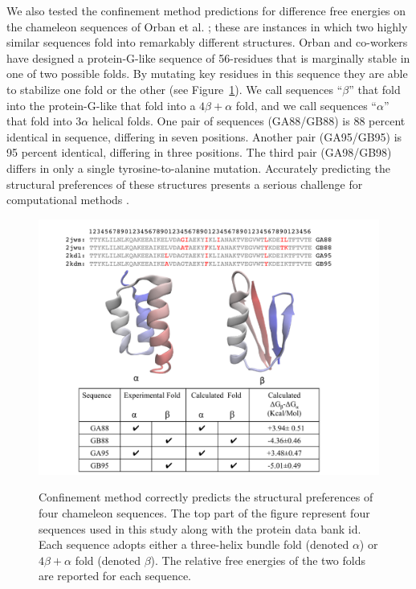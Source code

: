 \documentclass[12pt]{article}
\begin{document}
We also tested the confinement method predictions for difference free energies on the chameleon sequences of Orban 
et al. \cite{Alexander2007,He2008,Alexander2009,Bryan2010,He2012,Shortle2009}; these 
are instances in which two highly similar sequences fold into remarkably different structures. Orban and co-workers have designed a 
protein-G-like sequence of 56-residues that
is marginally stable in one of two possible folds. By mutating key residues in this sequence they
are able to stabilize one fold or the other (see Figure~\ref{fig:orban}). We call sequences ``$\beta$'' that fold into 
the protein-G-like that fold into a $4 \beta + \alpha$ fold, and we call sequences ``$\alpha$'' that fold into $3 \alpha$ helical folds.  One pair 
of sequences (GA88/GB88) is 88 percent identical in sequence, differing in seven positions. Another pair (GA95/GB95) is 95 percent identical, 
differing in three positions. The third pair (GA98/GB98) differs in only a single tyrosine-to-alanine mutation. Accurately predicting the 
structural preferences of these structures presents a serious challenge for computational methods 
\cite{Alexander2007,He2008,Alexander2009,Bryan2010,He2012,Shortle2009}.

\begin{figure}
\includegraphics[width=5.0in]{orban.pdf}
\label{fig:orban}
\caption{Confinement method correctly predicts the structural preferences of four chameleon
sequences. The top part of the figure represent four sequences used in this study along with the
protein data bank id. Each sequence adopts either a three-helix bundle fold (denoted $\alpha$) or
$4 \beta + \alpha$ fold (denoted $\beta$). The relative free energies of
the two folds are reported for each sequence.}
\end{figure}
\end{document}
